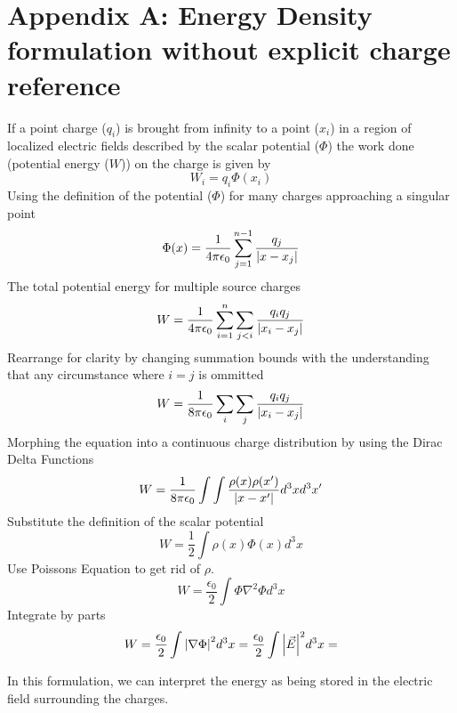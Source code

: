 \documentclass[12pt]{article}
\begin{document}
\section{Appendix A: Energy Density formulation without explicit charge reference} \label{App A}
    If a point charge ($q_i$) is brought from infinity to a point ($x_i$) in a region of localized electric fields described by the scalar potential ($\Phi$) the work done (potential energy ($W$)) on the charge is given by
    \begin{equation} \label{eq: }
        W_i = q_i \Phi(x_i)
    \end{equation}
    Using the definition of the potential ($\Phi$) for many charges approaching a singular point
    \begin{equation} \label{eq: }
        \Phi(x) = \frac{1}{4 \pi \epsilon_0} \sum_{j=1}^{n-1} \frac{q_j}{\abs{x-x_j}}
    \end{equation}
    The total potential energy for multiple source charges
    \begin{equation} \label{eq: }
        W = \frac{1}{4 \pi \epsilon_0} \sum_{i=1}^n \sum_{j<i} \frac{q_i q_j}{\abs{x_i-x_j}}
    \end{equation}
    Rearrange for clarity by changing summation bounds with the understanding that any circumstance where $i=j$ is ommitted
    \begin{equation} \label{eq: }
        W = \frac{1}{8 \pi \epsilon_0} \sum_i \sum_j \frac{q_i q_j}{\abs{x_i-x_j}}
    \end{equation}
    Morphing the equation into a continuous charge  distribution by using the Dirac Delta Functions
    \begin{equation} \label{eq: }
        W = \frac{1}{8 \pi \epsilon_0} \int \int \frac{\rho(x) \rho(x')}{\abs{x-x'}} d^3x d^3x'
    \end{equation}
    Substitute the definition of the scalar potential
    \begin{equation} \label{eq: }
        W = \frac{1}{2} \int \rho(x) \Phi(x) d^3x
    \end{equation}
    Use Poissons Equation to get rid of $\rho$.
    \begin{equation} \label{eq:}
        W = \frac{\epsilon_0}{2} \int \Phi \nabla^2 \Phi d^3x
    \end{equation}
    Integrate by parts
    \begin{equation} \label{eq: }
        W = \frac{\epsilon_0}{2} \int \abs{\nabla \Phi}^2 d^3x = \frac{\epsilon_0}{2} \int \abs{\vec{E}}^2 d^3x = 
    \end{equation}

    In this formulation, we can interpret the energy as being stored in the electric field surrounding the charges. 
    
    
\newpage
\printbibliography
\end{document}
